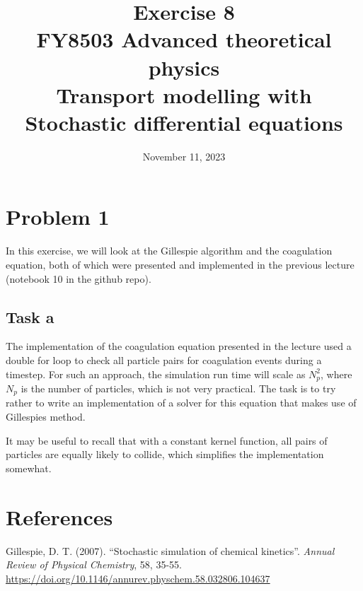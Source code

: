 \documentclass[a4paper]{article}
\title{\vspace{-3em} Exercise 8\\[10pt] \large FY8503 Advanced theoretical physics\\  Transport modelling with Stochastic differential equations}
\author{November 11, 2023}
\date{}
\begin{document}
\maketitle



\section*{Problem 1}

In this exercise, we will look at the Gillespie algorithm and the coagulation equation, both of which were presented and implemented in the previous lecture (notebook 10 in the github repo).

\subsection*{Task a}

The implementation of the coagulation equation presented in the lecture used a double for loop to check all particle pairs for coagulation events during a timestep. For such an approach, the simulation run time will scale as $N_p^2$, where $N_p$ is the number of particles, which is not very practical. The task is to try rather to write an implementation of a solver for this equation that makes use of Gillespies method.

It may be useful to recall that with a constant kernel function, all pairs of particles are equally likely to collide, which simplifies the implementation somewhat.


\section*{References}

Gillespie, D. T. (2007). ``Stochastic simulation of chemical kinetics''. \emph{Annual Review of Physical Chemistry}, 58, 35-55. \url{https://doi.org/10.1146/annurev.physchem.58.032806.104637}
\end{document}
